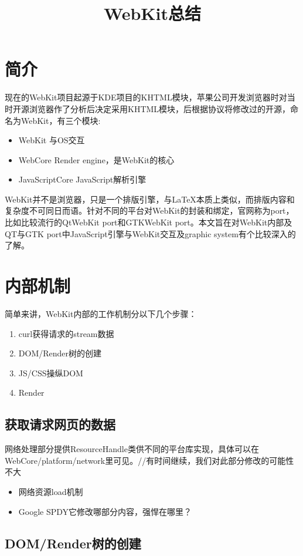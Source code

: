 

\title{WebKit总结}
\author{}
\maketitle
\section{简介}
现在的WebKit项目起源于KDE项目的KHTML模块，苹果公司开发浏览器时对当时开源浏览器作了分析后决定采用KHTML模块，后根据协议将修改过的开源，命名为WebKit，有三个模块:
\begin{itemize}
	\item WebKit 与OS交互
	\item WebCore Render engine，是WebKit的核心
	\item JavaScriptCore JavaScript解析引擎
\end{itemize}

WebKit并不是浏览器，只是一个排版引擎，与\LaTeX 本质上类似，而排版内容和复杂度不可同日而语。针对不同的平台对WebKit的封装和绑定，官网称为port，比如比较流行的QtWebKit port和GTKWebKit port。本文旨在对WebKit内部及QT与GTK port中JavaScript引擎与WebKit交互及graphic system有个比较深入的了解。
\section{内部机制}
简单来讲，WebKit内部的工作机制分以下几个步骤：
\begin{enumerate}
	\item curl获得请求的stream数据
	\item DOM/Render树的创建
	\item JS/CSS操纵DOM
	\item Render
\end{enumerate}
\subsection{获取请求网页的数据}
网络处理部分提供ResourceHandle类供不同的平台库实现，具体可以在WebCore/platform/network里可见。//有时间继续，我们对此部分修改的可能性不大
\begin{itemize}
	\item 网络资源load机制
	\item Google SPDY它修改哪部分内容，强悍在哪里？
\end{itemize}
\subsection{DOM/Render树的创建}
